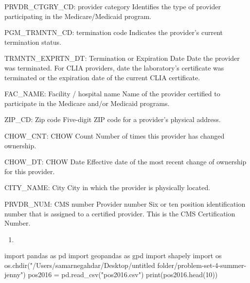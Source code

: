\documentclass[
  letterpaper,
  DIV=11,
  numbers=noendperiod]{scrartcl}
\newenvironment{Shaded}{\begin{snugshade}}{\end{snugshade}}
\newcommand{\BuiltInTok}[1]{\textcolor[rgb]{0.00,0.23,0.31}{#1}}
\newcommand{\DecValTok}[1]{\textcolor[rgb]{0.68,0.00,0.00}{#1}}
\newcommand{\ImportTok}[1]{\textcolor[rgb]{0.00,0.46,0.62}{#1}}
\newcommand{\NormalTok}[1]{\textcolor[rgb]{0.00,0.23,0.31}{#1}}
\newcommand{\OperatorTok}[1]{\textcolor[rgb]{0.37,0.37,0.37}{#1}}
\newcommand{\StringTok}[1]{\textcolor[rgb]{0.13,0.47,0.30}{#1}}
\providecommand{\tightlist}{%
  \setlength{\itemsep}{0pt}\setlength{\parskip}{0pt}}\usepackage{longtable,booktabs,array}
\begin{document}
PRVDR\_CTGRY\_CD: provider category Identifies the type of provider
participating in the Medicare/Medicaid program.

PGM\_TRMNTN\_CD: termination code Indicates the provider's current
termination status.

TRMNTN\_EXPRTN\_DT: Termination or Expiration Date Date the provider was
terminated. For CLIA providers, date the laboratory's certificate was
terminated or the expiration date of the current CLIA certificate.

FAC\_NAME: Facility / hospital name Name of the provider certified to
participate in the Medicare and/or Medicaid programs.

ZIP\_CD: Zip code Five-digit ZIP code for a provider's physical address.

CHOW\_CNT: CHOW Count Number of times this provider has changed
ownership.

CHOW\_DT: CHOW Date Effective date of the most recent change of
ownership for this provider.

CITY\_NAME: City City in which the provider is physically located.

PRVDR\_NUM: CMS number Provider number Six or ten position
identification number that is assigned to a certified provider. This is
the CMS Certification Number.

\begin{enumerate}
\def\labelenumi{\arabic{enumi}.}
\setcounter{enumi}{1}
\tightlist
\item
\end{enumerate}

\begin{Shaded}
\begin{Highlighting}[]
\ImportTok{import}\NormalTok{ pandas }\ImportTok{as}\NormalTok{ pd}
\ImportTok{import}\NormalTok{ geopandas }\ImportTok{as}\NormalTok{ gpd}
\ImportTok{import}\NormalTok{ shapely}
\ImportTok{import}\NormalTok{ os}
\NormalTok{os.chdir(}\StringTok{"/Users/samarnegahdar/Desktop/untitled folder/problem{-}set{-}4{-}summer{-}jenny"}\NormalTok{)}
\NormalTok{pos2016 }\OperatorTok{=}\NormalTok{ pd.read\_csv(}\StringTok{"pos2016.csv"}\NormalTok{)}
\BuiltInTok{print}\NormalTok{(pos2016.head(}\DecValTok{10}\NormalTok{))}
\end{Highlighting}
\end{Shaded}
\end{document}
